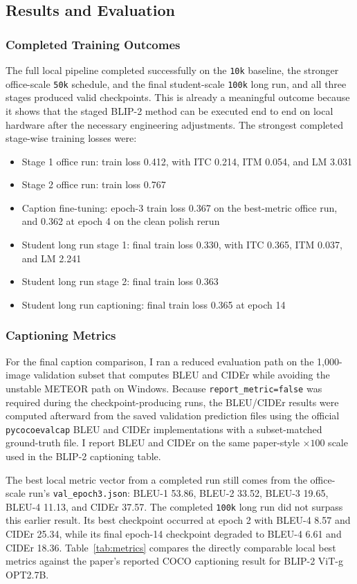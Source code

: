 \documentclass[11pt]{article}
\begin{document}
\subsection{Results and Evaluation}
\subsubsection{Completed Training Outcomes}
The full local pipeline completed successfully on the \texttt{10k} baseline, the stronger office-scale \texttt{50k} schedule, and the final student-scale \texttt{100k} long run, and all three stages produced valid checkpoints. This is already a meaningful outcome because it shows that the staged BLIP-2 method can be executed end to end on local hardware after the necessary engineering adjustments. The strongest completed stage-wise training losses were:
\begin{itemize}
\item Stage 1 office run: train loss 0.412, with ITC 0.214, ITM 0.054, and LM 3.031
\item Stage 2 office run: train loss 0.767
\item Caption fine-tuning: epoch-3 train loss 0.367 on the best-metric office run, and 0.362 at epoch 4 on the clean polish rerun
\item Student long run stage 1: final train loss 0.330, with ITC 0.365, ITM 0.037, and LM 2.241
\item Student long run stage 2: final train loss 0.363
\item Student long run captioning: final train loss 0.365 at epoch 14
\end{itemize}

\subsubsection{Captioning Metrics}
For the final caption comparison, I ran a reduced evaluation path on the 1,000-image validation subset that computes BLEU and CIDEr while avoiding the unstable METEOR path on Windows. Because \texttt{report\_metric=false} was required during the checkpoint-producing runs, the BLEU/CIDEr results were computed afterward from the saved validation prediction files using the official \texttt{pycocoevalcap} BLEU and CIDEr implementations with a subset-matched ground-truth file. I report BLEU and CIDEr on the same paper-style $\times 100$ scale used in the BLIP-2 captioning table.

The best local metric vector from a completed run still comes from the office-scale run's \texttt{val\_epoch3.json}: BLEU-1 53.86, BLEU-2 33.52, BLEU-3 19.65, BLEU-4 11.13, and CIDEr 37.57. The completed \texttt{100k} long run did not surpass this earlier result. Its best checkpoint occurred at epoch 2 with BLEU-4 8.57 and CIDEr 25.34, while its final epoch-14 checkpoint degraded to BLEU-4 6.61 and CIDEr 18.36. Table~\ref{tab:metrics} compares the directly comparable local best metrics against the paper's reported COCO captioning result for BLIP-2 ViT-g OPT2.7B.
\end{document}

